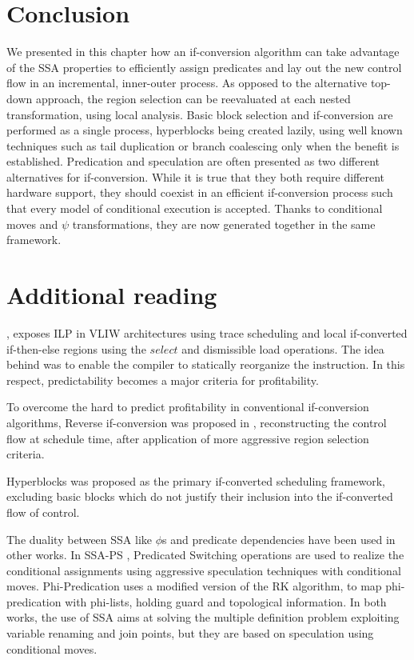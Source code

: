 \section{Conclusion} 

We presented in this chapter how an if-conversion algorithm can take advantage of the SSA properties to efficiently assign predicates and lay out the new control flow in an incremental, inner-outer process. As opposed to the alternative top-down approach, the region selection can be reevaluated at each nested transformation, using local analysis.
Basic block selection and if-conversion are performed as a single process, hyperblocks being created lazily, using well known techniques such as tail duplication or branch coalescing only when the benefit is established.
Predication and speculation are often presented as two different alternatives for if-conversion. While it is true that they both require different hardware support, they should coexist in an efficient if-conversion process such that every model of conditional execution is accepted. Thanks to conditional moves and $\psi$ transformations, they are now generated together in the same framework.

\section{Additional reading}

\cite{Rau:2003:IP:1074100.1074489}, exposes ILP in VLIW architectures using trace scheduling and local if-converted if-then-else regions using the $select$ and dismissible load operations. The idea behind was to enable the compiler to statically reorganize the instruction. In this respect, predictability \cite{Fisher:1992:PCB:143371.143493} becomes a major criteria for profitability.

To overcome the hard to predict profitability in conventional if-conversion algorithms, Reverse if-conversion was proposed in \cite{August:1999:PRI:326224.325595}, reconstructing the control flow at schedule time, after application of more aggressive region selection criteria.

Hyperblocks \cite{Mahlke:1992:ECS:144965.144998} was proposed as the primary if-converted scheduling framework, excluding basic blocks which do not justify their inclusion into the if-converted flow of control.

The duality between SSA like $\phi$s and predicate dependencies have been used in other works. In SSA-PS \cite{Jacome01clusteredvliw}, Predicated Switching operations are used to realize the conditional assignments using aggressive speculation techniques with conditional moves. Phi-Predication \cite{Chuang03phi-predicationfor} uses a modified version of the RK algorithm, to map phi-predication with phi-lists, holding guard and topological information. In both works, the use of SSA aims at solving the multiple definition problem exploiting variable renaming and join points, but they are based on speculation using conditional moves. 

